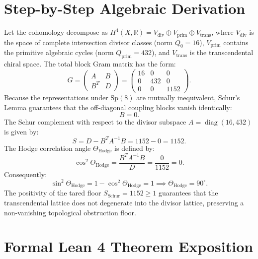 \documentclass[11pt,a4paper]{article}
\theoremstyle{definition}
\begin{document}
\section{Step-by-Step Algebraic Derivation}

Let the cohomology decompose as $H^4(X, \mathbb{R}) = V_{\mathrm{div}} \oplus V_{\mathrm{prim}} \oplus V_{\mathrm{trans}}$, where $V_{\mathrm{div}}$ is the space of complete intersection divisor classes (norm $Q_0 = 16$), $V_{\mathrm{prim}}$ contains the primitive algebraic cycles (norm $Q_{\mathrm{prim}} = 432$), and $V_{\mathrm{trans}}$ is the transcendental chiral space. The total block Gram matrix has the form:
\begin{equation}
G = \begin{pmatrix} A & B \\ B^T & D \end{pmatrix} = \begin{pmatrix} 16 & 0 & 0 \\ 0 & 432 & 0 \\ 0 & 0 & 1152 \end{pmatrix}.
\end{equation}
Because the representations under $\mathrm{Sp}(8)$ are mutually inequivalent, Schur's Lemma guarantees that the off-diagonal coupling blocks vanish identically:
\begin{equation}
B = 0.
\end{equation}
The Schur complement with respect to the divisor subspace $A = \operatorname{diag}(16, 432)$ is given by:
\begin{equation}
S = D - B^T A^{-1} B = 1152 - 0 = 1152.
\end{equation}
The Hodge correlation angle $\Theta_{\mathrm{Hodge}}$ is defined by:
\begin{equation}
\cos^2\Theta_{\mathrm{Hodge}} = \frac{B^T A^{-1} B}{D} = \frac{0}{1152} = 0.
\end{equation}
Consequently:
\begin{equation}
\sin^2\Theta_{\mathrm{Hodge}} = 1 - \cos^2\Theta_{\mathrm{Hodge}} = 1 \implies \Theta_{\mathrm{Hodge}} = 90^\circ.
\end{equation}
The positivity of the tared floor $S_{\mathrm{Schur}} = 1152 \ge 1$ guarantees that the transcendental lattice does not degenerate into the divisor lattice, preserving a non-vanishing topological obstruction floor.


\section{Formal Lean 4 Theorem Exposition}
\end{document}
